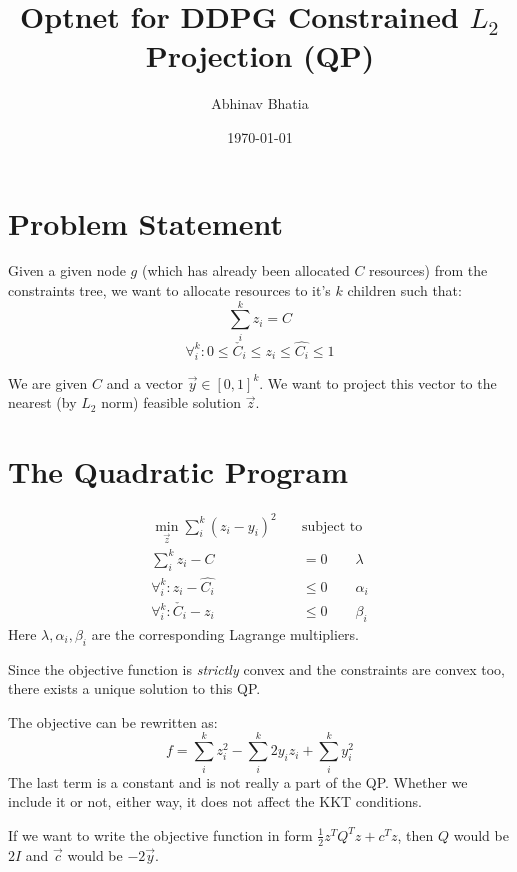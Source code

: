 \documentclass[11 pt]{article}
\begin{document}
\title{Optnet for DDPG Constrained $L_2$ Projection (QP)}
\author{Abhinav Bhatia}
\date{\today}
\maketitle


\section{Problem Statement}

Given a given node $g$ (which has already been allocated $C$ resources) from the constraints tree, we want to allocate resources to it's $k$ children such that:
\[\sum_i^k z_i = C \]
\[\forall_i^k : 0 \le \check{C_i} \le z_i \le \hat{C_i} \le 1\]

We are given $C$ and a vector $\vec{y} \in [0, 1]^k$. We want to project this vector to the nearest (by $L_2$ norm) feasible solution $\vec{z}$.


\section{The Quadratic Program}

\begin{equation} \label{qp}
    \begin{aligned}
        \underset{\vec{z}}{\min} \sum_i^k (z_i - y_i)^2 \quad &\text{subject to} \\
        \sum_i^k z_i - C &= 0                   \qquad \lambda\\
        \forall_i^k : z_i - \hat{C_i} &\le 0      \qquad \alpha_i\\
        \forall_i^k : \check{C_i} - z_i &\le 0    \qquad \beta_i
    \end{aligned}
\end{equation}
Here $\lambda,\alpha_i,\beta_i$ are the corresponding Lagrange multipliers.

Since the objective function is \textit{strictly} convex and the constraints are convex too, there exists a unique solution to this QP.

The objective can be rewritten as:
\[f = \sum_i^k z_i^2 - \sum_i^k 2 y_i z_i + \sum_i^k y_i^2\]
The last term is a constant and is not really a part of the QP. Whether we include it or not, either way, it does not affect the KKT conditions.

If we want to write the objective function in form $\frac{1}{2}z^T Q^T z + c^Tz$, then $Q$ would be $2I$ and $\vec{c}$ would be $-2\vec{y}$.
\end{document}
